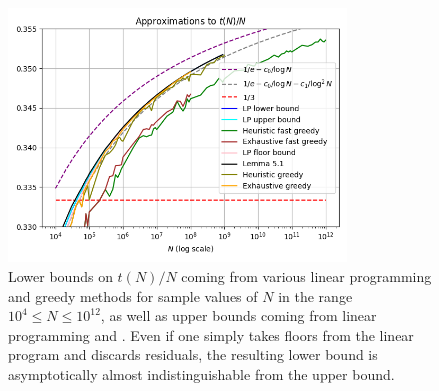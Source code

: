 \documentclass[12pt,a4paper,reqno]{amsart}
\numberwithin{equation}{section}
\theoremstyle{plain}
\theoremstyle{definition}
\begin{document}
\begin{figure}
  \centering
  \includegraphics[width=0.8\textwidth]{verylarge.png}
  \vspace{-16pt}
  \caption{\small Lower bounds on $t(N)/N$ coming from various linear programming and greedy methods for sample values of $N$ in the range $10^4 \leq N \leq 10^{12}$, as well as upper bounds coming from linear programming and .  Even if one simply takes floors from the linear program and discards residuals, the resulting lower bound is asymptotically almost indistinguishable from the upper bound. }\label{fig-verylarge}
\end{figure}
    
\end{document}
